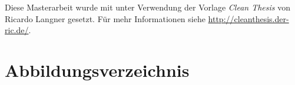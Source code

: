 
{%
\renewcommand{\bibfont}{\normalfont\small}
\setlength{\biblabelsep}{0pt}
\setlength{\bibitemsep}{0.5\baselineskip plus 0.5\baselineskip}
\printbibliography
}

\vfill

Diese Masterarbeit wurde mit \LaTeXe unter Verwendung der Vorlage \textit{Clean Thesis} von Ricardo Langner gesetzt.
Für mehr Informationen siehe \url{http://cleanthesis.der-ric.de/}.

\chapter*{Abbildungsverzeichnis}
\renewcommand\listfigurename{}
\vspace*{-2.35cm}
\listoffigures


\renewcommand\listalgorithmname{Algorithmenverzeichnis}
\listofalgorithms

\newpage
\renewcommand{\listoflistingscaption}{Listing-Verzeichnis}
\listoflistings

\cleardoublepage


